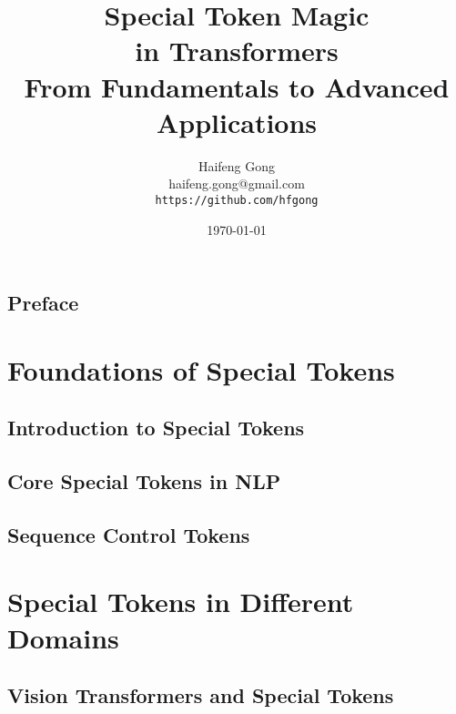 \documentclass[11pt,oneside]{book}
\title{{\Huge \textbf{Special Token Magic\\in Transformers}}\\[0.5cm]
{\large From Fundamentals to Advanced Applications}}
\author{{\Large Haifeng Gong}\\[0.3cm]
{\normalsize haifeng.gong@gmail.com}\\[0.5cm]
{\tt https://github.com/hfgong}}
\date{\today}
\theoremstyle{definition}
\theoremstyle{plain}
\theoremstyle{remark}
\begin{document}
\frontmatter
\maketitle

\tableofcontents

\chapter{Preface}


\mainmatter

\part{Foundations of Special Tokens}

\chapter{Introduction to Special Tokens}






\chapter{Core Special Tokens in NLP}





\chapter{Sequence Control Tokens}





\part{Special Tokens in Different Domains}

\chapter{Vision Transformers and Special Tokens}





\end{document}
